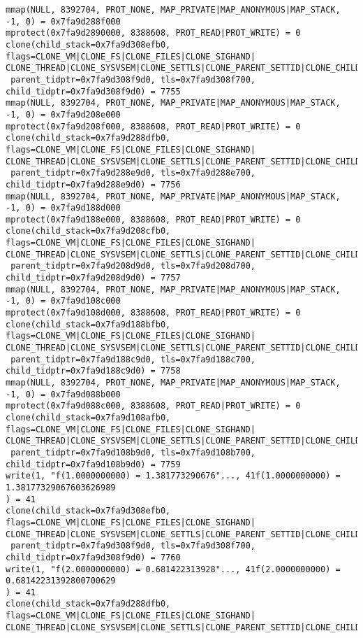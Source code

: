 \documentclass[12pt]{article}
\begin{document}
{\begin{lstlisting}[escapechar=!]
mmap(NULL, 8392704, PROT_NONE, MAP_PRIVATE|MAP_ANONYMOUS|MAP_STACK, -1, 0) = 0x7fa9d288f000
mprotect(0x7fa9d2890000, 8388608, PROT_READ|PROT_WRITE) = 0
clone(child_stack=0x7fa9d308efb0, flags=CLONE_VM|CLONE_FS|CLONE_FILES|CLONE_SIGHAND|
CLONE_THREAD|CLONE_SYSVSEM|CLONE_SETTLS|CLONE_PARENT_SETTID|CLONE_CHILD_CLEARTID,
 parent_tidptr=0x7fa9d308f9d0, tls=0x7fa9d308f700, child_tidptr=0x7fa9d308f9d0) = 7755
mmap(NULL, 8392704, PROT_NONE, MAP_PRIVATE|MAP_ANONYMOUS|MAP_STACK, -1, 0) = 0x7fa9d208e000
mprotect(0x7fa9d208f000, 8388608, PROT_READ|PROT_WRITE) = 0
clone(child_stack=0x7fa9d288dfb0, flags=CLONE_VM|CLONE_FS|CLONE_FILES|CLONE_SIGHAND|
CLONE_THREAD|CLONE_SYSVSEM|CLONE_SETTLS|CLONE_PARENT_SETTID|CLONE_CHILD_CLEARTID,
 parent_tidptr=0x7fa9d288e9d0, tls=0x7fa9d288e700, child_tidptr=0x7fa9d288e9d0) = 7756
mmap(NULL, 8392704, PROT_NONE, MAP_PRIVATE|MAP_ANONYMOUS|MAP_STACK, -1, 0) = 0x7fa9d188d000
mprotect(0x7fa9d188e000, 8388608, PROT_READ|PROT_WRITE) = 0
clone(child_stack=0x7fa9d208cfb0, flags=CLONE_VM|CLONE_FS|CLONE_FILES|CLONE_SIGHAND|
CLONE_THREAD|CLONE_SYSVSEM|CLONE_SETTLS|CLONE_PARENT_SETTID|CLONE_CHILD_CLEARTID,
 parent_tidptr=0x7fa9d208d9d0, tls=0x7fa9d208d700, child_tidptr=0x7fa9d208d9d0) = 7757
mmap(NULL, 8392704, PROT_NONE, MAP_PRIVATE|MAP_ANONYMOUS|MAP_STACK, -1, 0) = 0x7fa9d108c000
mprotect(0x7fa9d108d000, 8388608, PROT_READ|PROT_WRITE) = 0
clone(child_stack=0x7fa9d188bfb0, flags=CLONE_VM|CLONE_FS|CLONE_FILES|CLONE_SIGHAND|
CLONE_THREAD|CLONE_SYSVSEM|CLONE_SETTLS|CLONE_PARENT_SETTID|CLONE_CHILD_CLEARTID,
 parent_tidptr=0x7fa9d188c9d0, tls=0x7fa9d188c700, child_tidptr=0x7fa9d188c9d0) = 7758
mmap(NULL, 8392704, PROT_NONE, MAP_PRIVATE|MAP_ANONYMOUS|MAP_STACK, -1, 0) = 0x7fa9d088b000
mprotect(0x7fa9d088c000, 8388608, PROT_READ|PROT_WRITE) = 0
clone(child_stack=0x7fa9d108afb0, flags=CLONE_VM|CLONE_FS|CLONE_FILES|CLONE_SIGHAND|
CLONE_THREAD|CLONE_SYSVSEM|CLONE_SETTLS|CLONE_PARENT_SETTID|CLONE_CHILD_CLEARTID,
 parent_tidptr=0x7fa9d108b9d0, tls=0x7fa9d108b700, child_tidptr=0x7fa9d108b9d0) = 7759
write(1, "f(1.0000000000) = 1.381773290676"..., 41f(1.0000000000) = 1.38177329067603626989
) = 41
clone(child_stack=0x7fa9d308efb0, flags=CLONE_VM|CLONE_FS|CLONE_FILES|CLONE_SIGHAND|
CLONE_THREAD|CLONE_SYSVSEM|CLONE_SETTLS|CLONE_PARENT_SETTID|CLONE_CHILD_CLEARTID,
 parent_tidptr=0x7fa9d308f9d0, tls=0x7fa9d308f700, child_tidptr=0x7fa9d308f9d0) = 7760
write(1, "f(2.0000000000) = 0.681422313928"..., 41f(2.0000000000) = 0.68142231392800700629
) = 41
clone(child_stack=0x7fa9d288dfb0, flags=CLONE_VM|CLONE_FS|CLONE_FILES|CLONE_SIGHAND|
CLONE_THREAD|CLONE_SYSVSEM|CLONE_SETTLS|CLONE_PARENT_SETTID|CLONE_CHILD_CLEARTID,

\end{lstlisting}}
\end{document}
